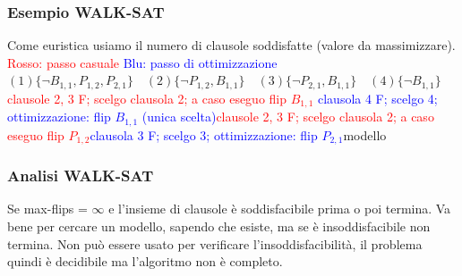 \documentclass{article}
\begin{document}
\subsubsection{Esempio WALK-SAT}
Come euristica usiamo il numero di clausole soddisfatte (valore da massimizzare). \newline
\textcolor{red}{Rosso: passo casuale} \newline
\textcolor{blue}{Blu: passo di ottimizzazione} \newline
$(1)\{\neg B_{1,1}, P_{1,2}, P_{2,1}\}\quad (2)\{\neg P_{1,2}, B_{1,1}\}\quad (3)\{\neg P_{2,1}, B_{1,1}\} \quad (4)\{\neg B_{1,1}\}$ \newline
[$B_{1,1}=F, P_{1,2}=T, P_{2,1}=T$] \textcolor{red}{clausole 2, 3 F; scelgo clausola 2; a caso eseguo flip $B_{1,1}$} \newline
[$B_{1,1}=T, P_{1,2}=T, P_{2,1}=T$] \textcolor{blue}{clausola 4 F; scelgo 4; ottimizzazione: flip $B_{1,1}$ (unica scelta)}\newline
[$B_{1,1}=F, P_{1,2}=T, P_{2,1}=T$] \textcolor{red}{clausole 2, 3 F; scelgo clausola 2; a caso eseguo flip $P_{1,2}$}\newline
[$B_{1,1}=F, P_{1,2}=F, P_{2,1}=T$] \textcolor{blue}{clausola 3 F; scelgo 3; ottimizzazione: flip $P_{2,1}$}\newline
[$B_{1,1}=F, P_{1,2}=F, P_{2,1}=F$] modello

\subsubsection{Analisi WALK-SAT}
Se max-flips = $\infty$ e l’insieme di clausole è soddisfacibile prima o poi termina. Va bene per cercare un modello, sapendo che esiste, ma se è insoddisfacibile non termina. Non può essere usato per verificare l’insoddisfacibilità, il problema quindi è decidibile ma l’algoritmo non è completo.
\end{document}
